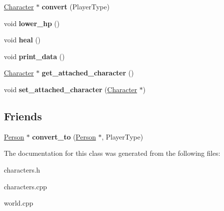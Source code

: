 \begin{DoxyCompactItemize}
\item 
\hypertarget{class_person_a1be820461df77d05bc9205ed9a304a84}{\hyperlink{class_character}{Character} $\ast$ {\bfseries convert} (Player\-Type)}\label{class_person_a1be820461df77d05bc9205ed9a304a84}

\item 
\hypertarget{class_person_aad0dd929eebdfd78cf6d99bdd792dd36}{void {\bfseries lower\-\_\-hp} ()}\label{class_person_aad0dd929eebdfd78cf6d99bdd792dd36}

\item 
\hypertarget{class_person_a2a81a35e2a6c15b5ac8787f64e1531f0}{void {\bfseries heal} ()}\label{class_person_a2a81a35e2a6c15b5ac8787f64e1531f0}

\item 
\hypertarget{class_person_aa43d99ab6de143fa6ee2bae94e25de92}{void {\bfseries print\-\_\-data} ()}\label{class_person_aa43d99ab6de143fa6ee2bae94e25de92}

\item 
\hypertarget{class_person_a2eeddf35fd72feda9ee79cb97cf4c77b}{\hyperlink{class_character}{Character} $\ast$ {\bfseries get\-\_\-attached\-\_\-character} ()}\label{class_person_a2eeddf35fd72feda9ee79cb97cf4c77b}

\item 
\hypertarget{class_person_ada0d3926855edff9375c100d118ad497}{void {\bfseries set\-\_\-attached\-\_\-character} (\hyperlink{class_character}{Character} $\ast$)}\label{class_person_ada0d3926855edff9375c100d118ad497}

\end{DoxyCompactItemize}
\subsection*{Friends}
\begin{DoxyCompactItemize}
\item 
\hypertarget{class_person_aad4eb6c63c6ff5e1ec0a11439ec421ad}{\hyperlink{class_person}{Person} $\ast$ {\bfseries convert\-\_\-to} (\hyperlink{class_person}{Person} $\ast$, Player\-Type)}\label{class_person_aad4eb6c63c6ff5e1ec0a11439ec421ad}

\end{DoxyCompactItemize}


The documentation for this class was generated from the following files\-:\begin{DoxyCompactItemize}
\item 
characters.\-h\item 
characters.\-cpp\item 
world.\-cpp\end{DoxyCompactItemize}
